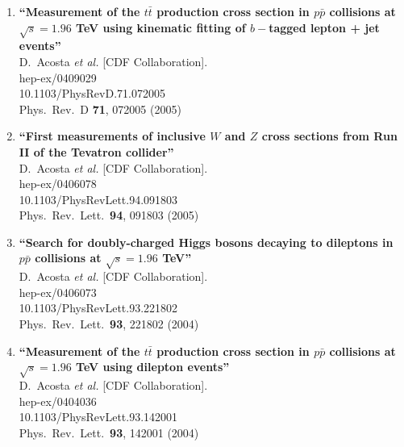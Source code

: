\documentclass{article}
\begin{document}
\begin{enumerate}
\item%
{\bf ``Measurement of the $t\bar{t}$ production cross section in $p\bar{p}$ collisions at $\sqrt{s} = 1.96$ TeV using kinematic fitting of $b-$tagged lepton + jet events''}
  \\{}D.~Acosta {\it et al.}  [CDF Collaboration].
  \\{}hep-ex/0409029
    \\{}10.1103/PhysRevD.71.072005
\\{}Phys.\ Rev.\ D {\bf 71}, 072005 (2005) %


\item%
{\bf ``First measurements of inclusive $W$ and $Z$ cross sections from Run II of the Tevatron collider''}
  \\{}D.~Acosta {\it et al.}  [CDF Collaboration].
  \\{}hep-ex/0406078
    \\{}10.1103/PhysRevLett.94.091803
\\{}Phys.\ Rev.\ Lett.\  {\bf 94}, 091803 (2005) %


\item%
{\bf ``Search for doubly-charged Higgs bosons decaying to dileptons in $p\bar{p}$ collisions at $\sqrt{s} = 1.96$ TeV''}
  \\{}D.~Acosta {\it et al.}  [CDF Collaboration].
  \\{}hep-ex/0406073
    \\{}10.1103/PhysRevLett.93.221802
\\{}Phys.\ Rev.\ Lett.\  {\bf 93}, 221802 (2004) %


\item%
{\bf ``Measurement of the $t\bar{t}$ production cross section in $p\bar{p}$ collisions at $\sqrt{s} = 1.96$ TeV using dilepton events''}
  \\{}D.~Acosta {\it et al.}  [CDF Collaboration].
  \\{}hep-ex/0404036
    \\{}10.1103/PhysRevLett.93.142001
\\{}Phys.\ Rev.\ Lett.\  {\bf 93}, 142001 (2004) %



\end{enumerate}
\end{document}
